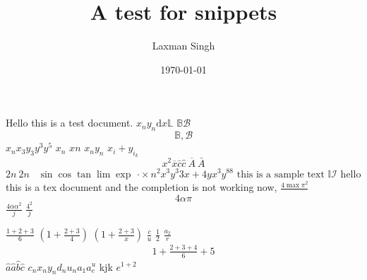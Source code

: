 \documentclass[12pt,a4paper]{article}
\author{Laxman Singh}
\date{\today}
\title{A test for snippets}
\begin{document}
    Hello this is a test document.
    \(x_{n} y_{n} \mathrm{d}x \mathbb{L} \)   
    \(\mathbb{B} \mathcal{B} \) \[\mathbb{B}, \mathcal{B}\] 
  \(x_{n} x_{3} y_{3} y^{3}y^{5}\) \(x_{n} \)  \(xn\) \(x_{n} y_{n}\)
\(x_{i}+y_{i_{k}}\) \[x^{2} \overline{x} \bar{c} \hat{c} \ \overline{A} \ \bar{A}  \] \(2n \ 2 n\) \ 
\(\sin \cos \tan \lim \exp \)  
\(\cdot \times n^{2} x^{3} y^{3} 3x+4y x^{3} y^{88}  \text{ this is a sample text } \mathbb{I} \mathcal{I}   \)  
hello this is a tex document and the completion is not working now, \( \frac{4\max\pi^{2}}{} \) 
\[4\alpha\pi\] \(\frac{4\alpha\alpha^{2}}{j}\) \(\frac{4^{2}}{j}\)  

\(\frac{1+2+3}{6}\) \((1+\frac{2+3}{4})  \) \((1+\frac{2+3}{x})\) \(\frac{c}{u}\) \(\frac{1}{2}\) 
\(\frac{a_{2}}{r}\) 
\begin{align*}
   1+\frac{2+3+4}{6}+5
\end{align*}
\(\hat{a} \hat{a} \hat{b} \hat{c}\) \(c_{n} x_{n} y_{n}d_{n}u_{n} a_{1} a^{u}_{e} \)
kjk
\(e^{1+2}\)
\end{document}
